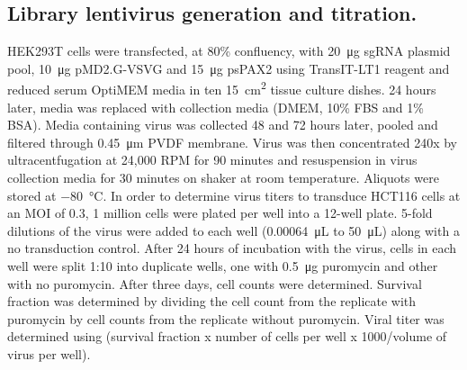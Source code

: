 \subsection{Library lentivirus generation and titration.}
HEK293T cells were transfected, at 80\% confluency, with \SI{20}{\micro\gram} sgRNA plasmid pool, \SI{10}{\micro\gram} pMD2.G-VSVG and \SI{15}{\micro\gram} psPAX2 using TransIT-LT1 reagent and reduced serum OptiMEM media in ten \SI{15}{\centi\meter\squared} tissue culture dishes. 24 hours later, media was replaced with collection media (DMEM, 10\% FBS and 1\% BSA). Media containing virus was collected 48 and 72 hours later, pooled and filtered through \SI{0.45}{\micro\meter} PVDF membrane. Virus was then concentrated 240x by ultracentfugation at 24,000 RPM for 90 minutes and resuspension in virus collection media for 30 minutes on shaker at room temperature. Aliquots were stored at \SI{-80}{\celsius}. 
In order to determine virus titers to transduce HCT116 cells at an MOI of 0.3, 1 million cells were plated per well into a 12-well plate. 5-fold dilutions of the virus were added to each well (\SI{0.00064}{\micro\liter} to \SI{50}{\micro\liter}) along with a no transduction control. After 24 hours of incubation with the virus, cells in each well were split 1:10 into duplicate wells, one with \SI{0.5}{\micro\gram} puromycin and other with no puromycin. After three days, cell counts were determined. Survival fraction was determined by dividing the cell count from the replicate with puromycin by cell counts from the replicate without puromycin. Viral titer was determined using (survival fraction x number of cells per well x 1000/volume of virus per well).  

